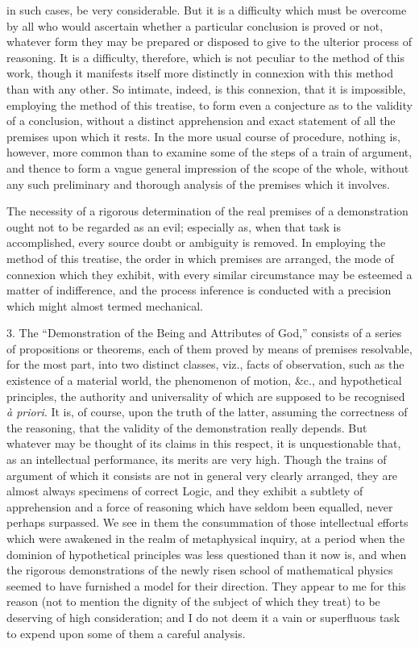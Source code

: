 \documentclass[oneside]{book}
\begin{document}
in such cases, be very considerable. But it is a difficulty which
must be overcome by all who would ascertain whether a particular
conclusion is proved or not, whatever form they may be
prepared or disposed to give to the ulterior process of reasoning.
It is a difficulty, therefore, which is not peculiar to the method
of this work, though it manifests itself more distinctly in connexion
with this method than with any other. So intimate, indeed,
is this connexion, that it is impossible, employing the method
of this treatise, to form even a conjecture as to the validity
of a conclusion, without a distinct apprehension and exact statement
of all the premises upon which it rests. In the more usual
course of procedure, nothing is, however, more common than to
examine some of the steps of a train of argument, and thence to
form a vague general impression of the scope of the whole, without
any such preliminary and thorough analysis of the premises
which it involves.

The necessity of a rigorous determination of the real premises
of a demonstration ought not to be regarded as an evil;
especially as, when that task is accomplished, every source
doubt or ambiguity is removed. In employing the method of
this treatise, the order in which premises are arranged, the mode
of connexion which they exhibit, with every similar circumstance
may be esteemed a matter of indifference, and the process
inference is conducted with a precision which might almost
termed mechanical.

3. The ``Demonstration of the Being and Attributes of
God,'' consists of a series of propositions or theorems, each
of them proved by means of premises resolvable, for the most
part, into two distinct classes, viz., facts of observation, such
as the existence of a material world, the phenomenon of motion,
\&c., and hypothetical principles, the authority and universality
of which are supposed to be recognised \textit{\`{a} priori}. It is,
of course, upon the truth of the latter, assuming the correctness
of the reasoning, that the validity of the demonstration really depends.
But whatever may be thought of its claims in this respect,
it is unquestionable that, as an intellectual performance, its
merits are very high. Though the trains of argument of which
it consists are not in general very clearly arranged, they are almost
always specimens of correct Logic, and they exhibit a
subtlety of apprehension and a force of reasoning which have
seldom been equalled, never perhaps surpassed. We see in them
the consummation of those intellectual efforts which were awakened
in the realm of metaphysical inquiry, at a period when the
dominion of hypothetical principles was less questioned than it
now is, and when the rigorous demonstrations of the newly risen
school of mathematical physics seemed to have furnished a model
for their direction. They appear to me for this reason (not to
mention the dignity of the subject of which they treat) to be
deserving of high consideration; and I do not deem it a vain
or superfluous task to expend upon some of them a careful
analysis.
\end{document}
